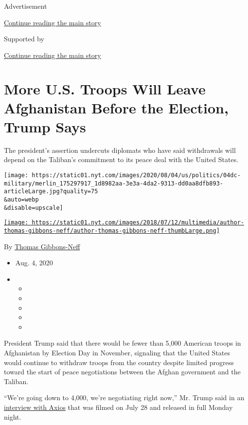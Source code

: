 Advertisement

\protect\hyperlink{after-top}{Continue reading the main story}

Supported by

\protect\hyperlink{after-sponsor}{Continue reading the main story}

\hypertarget{more-us-troops-will-leave-afghanistan-before-the-election-trump-says}{%
\section{More U.S. Troops Will Leave Afghanistan Before the Election,
Trump
Says}\label{more-us-troops-will-leave-afghanistan-before-the-election-trump-says}}

The president's assertion undercuts diplomats who have said withdrawals
will depend on the Taliban's commitment to its peace deal with the
United States.

\texttt{[image: https://static01.nyt.com/images/2020/08/04/us/politics/04dc-military/merlin\_175297917\_1d8982aa-3e3a-4da2-9313-dd0aa8dfb893-articleLarge.jpg?quality=75\\\&auto=webp\\\&disable=upscale]}

\href{https://www.nytimes.com/by/thomas-gibbons-neff}{\texttt{[image: https://static01.nyt.com/images/2018/07/12/multimedia/author-thomas-gibbons-neff/author-thomas-gibbons-neff-thumbLarge.png]}}

By \href{https://www.nytimes.com/by/thomas-gibbons-neff}{Thomas
Gibbons-Neff}

\begin{itemize}
\item
  Aug. 4, 2020
\item
  \begin{itemize}
  \item
  \item
  \item
  \item
  \item
  \end{itemize}
\end{itemize}

President Trump said that there would be fewer than 5,000 American
troops in Afghanistan by Election Day in November, signaling that the
United States would continue to withdraw troops from the country despite
limited progress toward the start of peace negotiations between the
Afghan government and the Taliban.

``We're going down to 4,000, we're negotiating right now,'' Mr. Trump
said in an
\href{https://www.axios.com/full-axios-hbo-interview-donald-trump-cd5a67e1-6ba1-46c8-bb3d-8717ab9f3cc5.html}{interview
with Axios} that was filmed on July 28 and released in full Monday
night.

